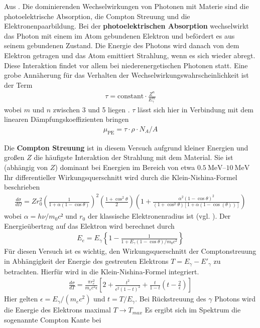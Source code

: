 Aus \cite{book:gil}. Die dominierenden Wechselwirkungen von Photonen mit
Materie sind die photoelektrische Absorption, die Compton Streuung und die
Elektronenpaarbildung. Bei der \textbf{photoelektrischen Absorption}
wechselwirkt das Photon mit einem im Atom gebundenen Elektron und befördert es
aus seinem gebundenen Zustand. Die Energie des Photons wird danach von dem
Elektron getragen und das Atom emittiert Strahlung, wenn es sich wieder abregt. Diese Interaktion
findet vor allem bei niederenergetischen Photonen statt. Eine grobe Annäherung
für das Verhalten der Wechselwirkungswahrscheinlichkeit ist der Term
\begin{align}
	\tau = \text{constant} \cdot \frac{Z^n}{E_{\gamma}^{m}}
\end{align} %
wobei $m$ und $n$ zwischen 3 und 5 liegen \cite[vgl.][Kap 2.2.1]{book:gil}.
$\tau$ lässt sich hier in Verbindung mit dem linearen Dämpfungskoeffizienten bringen
\begin{align}
	\mu_{\text{PE}} = \tau \cdot \rho \cdot N_A /A
\end{align}

Die \textbf{Compton Streuung} ist in diesem Versuch aufgrund kleiner Energien
und großen $Z$ die häufigste Interaktion der Strahlung mit dem Material. Sie
ist (abhängig von $Z$) dominant bei Energien im Bereich von etwa
$\qtyrange{0.5}{10}{\MeV}$ Ihr differentieller Wirkungsquerschnitt wird durch die
Klein-Nishina-Formel beschrieben
\begin{align}
	\frac{d\sigma}{d \Omega} = Z r_0^2 \left(\frac{1}{1+\alpha(1-\cos\theta)}\right)^2
	\left(\frac{1+ \cos^2\theta}{2}\right)%
	\left(1+ \frac{\alpha^2(1-\cos \theta)^2}{(1+\cos^2 \theta)[1+\alpha(1-\cos(\theta))]}\right)
	\label{eq:wq_compton}
\end{align}%
wobei $\alpha = h \nu / m_0 c²$ und $r_0$ der klassische Elektronenradius ist (vgl. \cite{book:knoll}).
Der Energieübertrag auf das Elektron wird berechnet durch
\begin{align}
	E_{e} = E_{\gamma} \left\{1- \frac{1}{1+ E_{\gamma}(1-\cos\theta)/m_0 c^2} \right\}
	\label{eq:ecompton}
\end{align}
Für diesen Versuch ist es wichtig, den Wirkungsquerschnitt der Comptonstreuung in Abhängigkeit der
Energie des gestreuten Elektrons $T = E_{\gamma} - E'_{\gamma}$ zu betrachten.
Hierfür wird in \cite[][Kap. 3.5.3]{book:kolano} die Klein-Nishina-Formel integriert.
\begin{align}
	\frac{d \sigma}{d T} =  \frac{\pi r_{e}^{2}}{m_e c^2 \epsilon}%
	\left[2 + \frac{t^2}{\epsilon^2(1-t)^2} + \frac{t}{1-t} %
		\left(t - \frac{2}{\epsilon} \right) \right]
	\label{eq:compton_energie}
\end{align}
Hier gelten $\epsilon = E_{\gamma} / (m_e c^2)$ und $t = T/ E_\gamma$.
Bei Rückstreuung des $\gamma$ Photons wird die Energie des Elektrons maximal
$T \rightarrow T_{max}$
Es ergibt sich im Spektrum die sogenannte Compton Kante bei

